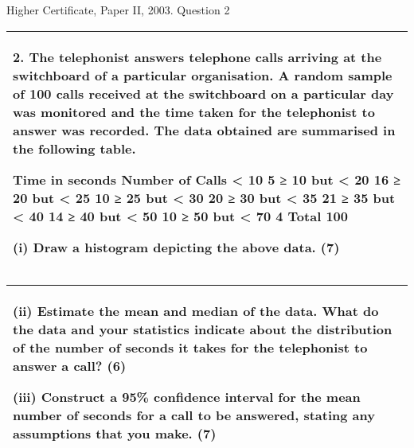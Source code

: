 \documentclass[a4paper,12pt]{article}
\begin{document}
Higher Certificate, Paper II, 2003. Question 2


\begin{table}[ht!]
 
\centering
 
\begin{tabular}{|p{15cm}|}
 
\hline  
2. The telephonist answers telephone calls arriving at the switchboard of a particular organisation.  A random sample of 100 calls received at the switchboard on a particular day was monitored and the time taken for the telephonist to answer was recorded.  The data obtained are summarised in the following table. 
 
Time in seconds Number of Calls < 10     5 ≥ 10 but < 20   16 ≥ 20 but < 25   10 ≥ 25 but < 30   20 ≥ 30 but < 35   21 ≥ 35 but < 40   14 ≥ 40 but < 50   10 ≥ 50 but < 70     4 Total 100 
 
 
(i) Draw a histogram depicting the above data. 
(7) 
 

\\ \hline
  
\end{tabular}

\end{table}

\begin{table}[ht!]
 
\centering
 
\begin{tabular}{|p{15cm}|}
 
\hline  
(ii) Estimate the mean and median of the data.  What do the data and your statistics indicate about the distribution of the number of seconds it takes for the telephonist to answer a call? (6) 
 
(iii) Construct a 95\% confidence interval for the mean number of seconds for a call to be answered, stating any assumptions that you make. (7) 
 
\\ \hline
  
\end{tabular}

\end{table}
 


 
 
\end{document}
